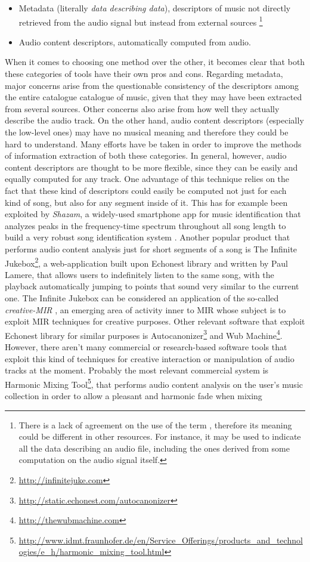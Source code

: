 \begin{itemize}
\item Metadata (literally \textit{data describing data}), descriptors of music not directly retrieved from the audio signal but instead from external sources \footnote{There is a lack of agreement on the use of the term , therefore its meaning could be different in other resources. For instance, it may be used to indicate all the data describing an audio file, including the ones derived from some computation on the audio signal itself.}
\item Audio content descriptors, automatically computed from audio.
\end{itemize}
When it comes to choosing one method over the other, it becomes clear that both these categories of tools have their own pros and cons. Regarding metadata, major concerns arise from the questionable consistency of the descriptors among the entire catalogue catalogue of music, given that they may have been extracted from several sources. Other concerns also arise from how well they actually describe the audio track. On the other hand, audio content descriptors (especially the low-level ones) may have no musical meaning and therefore they could be hard to understand. Many efforts have be taken in order to improve the methods of information extraction of both these categories. In general, however, audio content descriptors are thought to be more flexible, since they can be easily and equally computed for any track. One advantage of this technique relies on the fact that these kind of descriptors could easily be computed not just for each kind of song, but also for any segment inside of it. This has for example been exploited by \textit{Shazam}, a widely-used smartphone app for music identification that analyzes peaks in the frequency-time spectrum throughout all song length to build a very robust song identification system \cite{shazam03}. Another popular product that performs audio content analysis just for short segments of a song is The Infinite Jukebox\footnote{\url{http://infinitejuke.com}}, a web-application built upon Echonest library and written by Paul Lamere, that allows users to indefinitely listen to the same song, with the playback automatically jumping to points that sound very similar to the current one. The Infinite Jukebox can be considered an application of the so-called \textit{creative-MIR} \cite{xavier2013}, an emerging area of activity inner to MIR whose subject is to exploit MIR techniques for creative purposes.  Other relevant software that exploit Echonest library for similar purposes is Autocanonizer\footnote{\url{http://static.echonest.com/autocanonizer}} and Wub Machine\footnote{\url{http://thewubmachine.com}}. However, there aren't many commercial or research-based software tools that exploit this kind of techniques for creative interaction or manipulation of audio tracks at the moment. Probably the most relevant commercial system is Harmonic Mixing Tool\footnote{\url{http://www.idmt.fraunhofer.de/en/Service_Offerings/products_and_technologies/e_h/harmonic_mixing_tool.html}}, that performs audio content analysis on the user's music collection in order to allow a pleasant and harmonic fade when mixing 